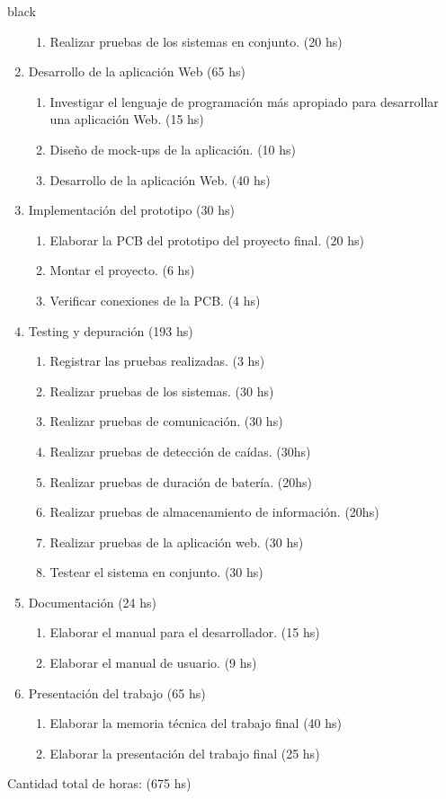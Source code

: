 \documentclass[11pt]{charter}
\begin{document}
\begin{consigna}{black}
\begin{enumerate}
\begin{enumerate}
	\item Realizar pruebas de los sistemas en conjunto. (20 hs)
	\end{enumerate}
\item Desarrollo de la aplicación Web (65 hs)
	\begin{enumerate}
	\item Investigar el lenguaje de programación más apropiado para desarrollar una aplicación Web. (15 hs)
	\item Diseño de mock-ups de la aplicación. (10 hs)
	\item Desarrollo de la aplicación Web. (40 hs)
	\end{enumerate}
\item Implementación del prototipo (30 hs)
	\begin{enumerate}
	\item Elaborar la PCB del prototipo del proyecto final. (20 hs)
	\item Montar el proyecto. (6 hs)
	\item Verificar conexiones de la PCB. (4 hs)
	\end{enumerate}
\item Testing y depuración (193 hs)
	\begin{enumerate}
	\item Registrar las pruebas realizadas. (3 hs)
	\item Realizar pruebas de los sistemas. (30 hs)
	\item Realizar pruebas de comunicación. (30 hs)
	\item Realizar pruebas de detección de caídas. (30hs)
	\item Realizar pruebas de duración de batería. (20hs)
	\item Realizar pruebas de almacenamiento de información. (20hs)
	\item Realizar pruebas de la aplicación web.  (30 hs)
	\item Testear el sistema en conjunto. (30 hs)
	\end{enumerate}
\item Documentación (24 hs)
	\begin{enumerate}
	\item Elaborar el manual para el desarrollador. (15 hs)
	\item Elaborar el manual de usuario. (9 hs)
	\end{enumerate}
\item Presentación del trabajo (65 hs)
	\begin{enumerate}
	\item Elaborar la memoria técnica del trabajo final (40 hs)
	\item Elaborar la presentación del trabajo final (25 hs)
	\end{enumerate}
\end{enumerate}

Cantidad total de horas: (675 hs)

\end{consigna}
\end{document}
